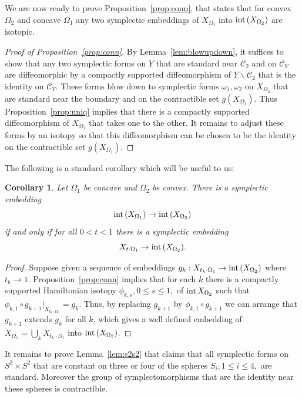 \documentclass[11pt, reqno]{amsart}
\newtheorem{cor}[thm]{Corollary}
\theoremstyle{remark}
\numberwithin{equation}{subsection}
\numberwithin{figure}{section}
\theoremstyle{customremark}
\newcommand{\intt}{{\rm int}}
\newcommand{\Cc}{{\mathcal C}}
\newcommand{\Om}{{\Omega}}
\newcommand{\om}{{\omega}}
\newcommand{\less} {{\smallsetminus}}
\newcommand{\MS}{{\medskip}}
\begin{document}
We are now ready to prove Proposition~\ref{prop:conn}, that states that for convex $\Om_2$ and concave $\Om_1$ any two symplectic embeddings of $X_{\Om_1}$ into $\intt\, (X_{\Om_2})$ are isotopic.

\begin{proof}[Proof of Proposition~\ref{prop:conn}]

By Lemma~\ref{lem:blowupdown}, it suffices to show that any two symplectic forms  on $Y$ that are standard near $\Cc_2$ and on $\Cc_Y$ are diffeomorphic by a compactly supported diffeomorphism of $Y\less \Cc_2$ that is the identity on $\Cc_Y$. These forms blow down to symplectic forms $\om_1, \om_2$ on $X_{\Om_2}$ that are standard near the boundary and on the contractible set $g(X_{\Om_1})$. Thus 
Proposition~\ref{prop:uniq} implies  that there is a compactly supported diffeomorphism of $X_{\Om_2}$ that takes one to the other.  It remains to adjust these forms by an isotopy so that this diffeomorphism can be chosen to be the identity on the contractible set $g(X_{\Om_1})$.
\end{proof}



The following is a standard corollary which will be useful to us:

\begin{cor}
\label{cor:sta}
Let $\Omega_1$ be concave and $\Omega_2$ be convex.  There is a symplectic embedding
\[ \intt\, (X_{\Omega_1}) \to \intt\, (X_{\Omega_2})\]
if and only if for all $0 < t < 1$ there is a symplectic embedding
\[ X_{t \cdot \Omega_1} \to \intt\, (X_{\Omega_2}).\]
\end{cor}
\begin{proof} Suppose given a sequence of embeddings $g_k:X_{t_k \cdot \Omega_1} \to \intt\, (X_{\Omega_2})$ where $t_k\to 1$. 
Proposition~\ref{prop:conn} implies that for each $k$ there is a compactly supported Hamiltonian isotopy $\phi_{k,s}, 0\le s\le 1,$ of $\intt\,  X_{\Om_2}$ such that 
$\phi_{k,1}\circ g_{k+1}|_{X_{t_k \cdot \Omega_1}} = g_k$.
Thus, by replacing $g_{k+1}$ by $\phi_{k,1}\circ g_{k+1}$ we  can arrange that $g_{k+1}$ extends $g_k$ for all $k$, which gives a well defined embedding
of $X_{\Om_1} = \bigcup_k X_{t_k\cdot \Om_1}$ into $\intt\, (X_{\Om_2})$.
\end{proof}

It remains to prove Lemma~\ref{lem:s2s2} that claims that all symplectic forms on $S^2 \times S^2$ that are constant on three or four of the spheres $S_i, 1\le i\le 4,$ are standard. Moreover the group of symplectomorphisms that are the identity near these spheres is  contractible.
\MS
\end{document}
